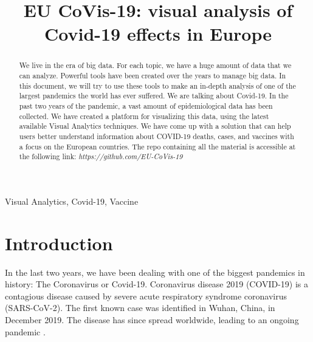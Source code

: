 \documentclass[10pt,conference]{IEEEtran}
\begin{document}
\title{EU CoVis-19: visual analysis of Covid-19 effects in Europe}


\author{
 \and
 \and
}

\maketitle

\begin{abstract}
 We live in the era of big data. For each topic, we have a huge amount of data that we can analyze. 
 Powerful tools have been created over the years to manage big data. In this document, we will try to use these tools to make 
 an in-depth analysis of one of the largest pandemics the world has ever suffered. We are talking about Covid-19. In the past 
 two years of the pandemic, a vast amount of epidemiological data has been collected. We have created a platform for visualizing 
 this data, using the latest available Visual Analytics techniques. We have come up with a solution that can help users better 
 understand information about COVID-19 deaths, cases, and vaccines with a focus on the European countries.
 The repo containing all the material is accessible at the following link: \emph{https://github.com/EU-CoVis-19}
\end{abstract}
\begin{IEEEkeywords}
Visual Analytics, Covid-19, Vaccine
\end{IEEEkeywords}

\section{Introduction}
In the last two years, we have been dealing with one of the biggest pandemics in history: The Coronavirus or Covid-19. Coronavirus disease 2019 (COVID-19) is a contagious disease caused by severe acute respiratory syndrome coronavirus (SARS-CoV-2). The first known case was identified in Wuhan, China, in December 2019. The disease has since spread worldwide, leading to an ongoing pandemic \cite{covid19}.
\end{document}
